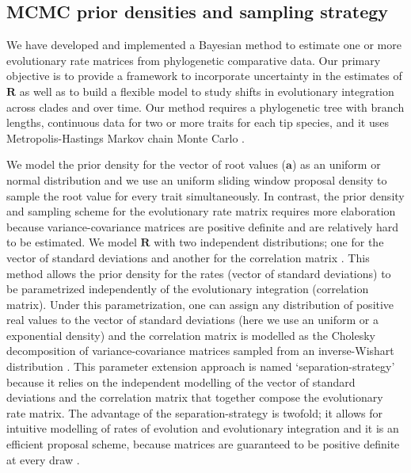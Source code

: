\subsection{MCMC prior densities and sampling strategy}

We have developed and implemented a Bayesian method to estimate one or more evolutionary rate matrices from phylogenetic comparative data. Our primary objective is to provide a framework to incorporate uncertainty in the estimates of $\mathbf{R}$ as well as to build a flexible model to study shifts in evolutionary integration across clades and over time. Our method requires a phylogenetic tree with branch lengths, continuous data for two or more traits for each tip species, and it uses Metropolis-Hastings Markov chain Monte Carlo \citep[MCMC,][]{metropolis_equation_1953, hastings_monte_1970}.

We model the prior density for the vector of root values ($\mathbf{a}$) as an uniform or normal distribution and we use an uniform sliding window proposal density to sample the root value for every trait simultaneously. In contrast, the prior density and sampling scheme for the evolutionary rate matrix requires more elaboration because variance-covariance matrices are positive definite and are relatively hard to be estimated. We model $\mathbf{R}$ with two independent distributions; one for the vector of standard deviations and another for the correlation matrix \citep{barnard_modeling_2000, zhang_sampling_2006}. This method allows the prior density for the rates (vector of standard deviations) to be parametrized independently of the evolutionary integration (correlation matrix). Under this parametrization, one can assign any distribution of positive real values to the vector of standard deviations (here we use an uniform or a exponential density) and the correlation matrix is modelled as the Cholesky decomposition of variance-covariance matrices sampled from an inverse-Wishart distribution \citep{zhang_sampling_2006}. This parameter extension approach is named `separation-strategy' \citep{barnard_modeling_2000, zhang_sampling_2006} because it relies on the independent modelling of the vector of standard deviations and the correlation matrix that together compose the evolutionary rate matrix. The advantage of the separation-strategy is twofold; it allows for intuitive modelling of rates of evolution and evolutionary integration and it is an efficient proposal scheme, because matrices are guaranteed to be positive definite at every draw \citep{barnard_modeling_2000, zhang_sampling_2006}.

